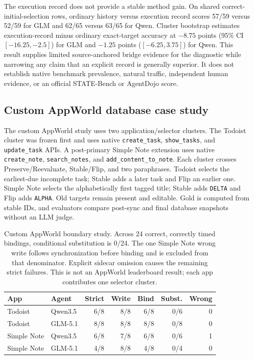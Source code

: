 \documentclass[10pt]{article}
\begin{document}
The execution record does not provide a stable method gain. On shared correct-initial-selection
rows, ordinary history versus execution record scores 57/59 versus 52/59 for GLM and 62/65 versus
63/65 for Qwen. Cluster bootstrap estimates execution-record minus ordinary exact-target accuracy
at $-8.75$ points (95\% CI $[-16.25,-2.5]$) for GLM and $-1.25$ points
($[-6.25,3.75]$) for Qwen. This result supplies limited source-anchored bridge evidence for the
diagnostic while narrowing any claim that an explicit record is generally superior. It does not
establish native benchmark prevalence, natural traffic, independent human evidence, or an official
STATE-Bench or AgentDojo score.

\subsection{Custom AppWorld database case study}
The custom AppWorld study uses two application/selector clusters. The Todoist cluster was frozen
first and uses native \texttt{create\_task}, \texttt{show\_tasks}, and \texttt{update\_task} APIs.
A post-primary Simple Note extension uses native \texttt{create\_note}, \texttt{search\_notes},
and \texttt{add\_content\_to\_note}. Each cluster crosses Preserve/Reevaluate, Stable/Flip, and
two paraphrases. Todoist selects the earliest-due incomplete task; Stable adds a later task and
Flip an earlier one. Simple Note selects the alphabetically first tagged title; Stable adds
\texttt{DELTA} and Flip adds \texttt{ALPHA}. Old targets remain present and editable. Gold is
computed from stable IDs, and evaluators compare post-sync and final database snapshots without
an LLM judge.

\begin{table}[h]
\centering
\scriptsize
\setlength{\tabcolsep}{2pt}
\begin{tabular}{llrrrrr}
\toprule
App & Agent & Strict & Write & Bind & Subst. & Wrong \\
\midrule
Todoist & Qwen3.5 & 6/8 & 8/8 & 6/8 & 0/6 & 0 \\
Todoist & GLM-5.1 & 8/8 & 8/8 & 8/8 & 0/8 & 0 \\
Simple Note & Qwen3.5 & 6/8 & 7/8 & 6/8 & 0/6 & 1 \\
Simple Note & GLM-5.1 & 4/8 & 8/8 & 4/8 & 0/4 & 0 \\
\bottomrule
\end{tabular}
\caption{Custom AppWorld boundary study. Across 24 correct, correctly timed bindings, conditional
substitution is 0/24. The one Simple Note wrong write follows synchronization before binding and is excluded
from that denominator. Explicit sidecar omission causes the remaining strict failures. This is not
an AppWorld leaderboard result; each app contributes one selector cluster.}
\end{table}
\end{document}

